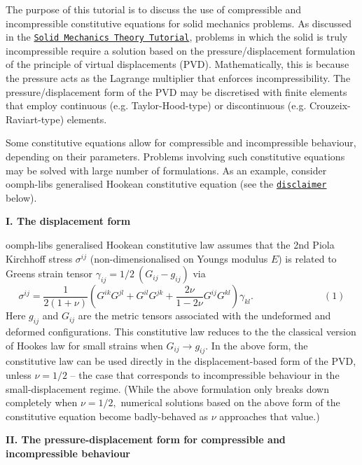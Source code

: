 The purpose of this tutorial is to discuss the use of compressible and incompressible constitutive equations for solid mechanics problems. As discussed in the \href{../../solid_theory/html/index.html#elastic_constitutive}{\tt Solid Mechanics Theory Tutorial}, problems in which the solid is truly incompressible require a solution based on the pressure/displacement formulation of the principle of virtual displacements (P\+VD). Mathematically, this is because the pressure acts as the Lagrange multiplier that enforces incompressibility. The pressure/displacement form of the P\+VD may be discretised with finite elements that employ continuous (e.\+g. Taylor-\/\+Hood-\/type) or discontinuous (e.\+g. Crouzeix-\/\+Raviart-\/type) elements.

Some constitutive equations allow for compressible and incompressible behaviour, depending on their parameters. Problems involving such constitutive equations may be solved with large number of formulations. As an example, consider {\ttfamily oomph-\/lib\textquotesingle{}s} generalised Hookean constitutive equation (see the \href{#disclaimer}{\tt disclaimer} below).

{\bfseries  I. The displacement form }

{\ttfamily oomph-\/lib\textquotesingle{}s} generalised Hookean constitutive law assumes that the 2nd Piola Kirchhoff stress $ \sigma^{ij} $ (non-\/dimensionalised on Young\textquotesingle{}s modulus $ E $) is related to Green\textquotesingle{}s strain tensor $ \gamma_{ij} = 1/2 \ (G_{ij} - g_{ij}) $ via \[ \sigma^{ij} = \frac{1}{2(1+\nu)} \left( G^{ik} G^{jl} + G^{il} G^{jk} + \frac{2\nu}{1-2\nu} G^{ij} G^{kl} \right) \gamma_{kl}. \hspace{3cm} (1) \] Here $ g_{ij} $ and $ G_{ij} $ are the metric tensors associated with the undeformed and deformed configurations. This constitutive law reduces to the the classical version of Hooke\textquotesingle{}s law for small strains when $ G_{ij} \to g_{ij}. $ In the above form, the constitutive law can be used directly in the displacement-\/based form of the P\+VD, unless $ \nu = 1/2 $ -- the case that corresponds to incompressible behaviour in the small-\/displacement regime. (While the above formulation only breaks down completely when $ \nu = 1/2, $ numerical solutions based on the above form of the constitutive equation become badly-\/behaved as $ \nu $ approaches that value.)

{\bfseries  II. The pressure-\/displacement form for compressible and incompressible behaviour}

